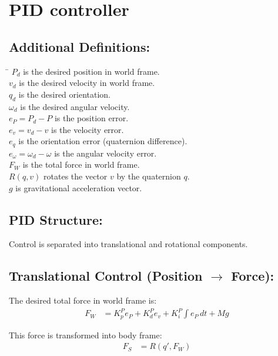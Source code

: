 \documentclass{article}
\begin{document}
\section{PID controller}

\subsection*{Additional Definitions:}
\begin{tabbing}
    \hspace{1cm}\= \kill
    \> \( P_d \) is the desired position in world frame. \\
    \> \( v_d \) is the desired velocity in world frame. \\
    \> \( q_d \) is the desired orientation. \\
    \> \( \omega_d \) is the desired angular velocity. \\
    \> \( e_P = P_d - P \) is the position error. \\
    \> \( e_v = v_d - v \) is the velocity error. \\
    \> \( e_q \) is the orientation error (quaternion difference). \\
    \> \( e_\omega = \omega_d - \omega \) is the angular velocity error. \\
    \> \( F_W \) is the total force in world frame. \\
    \> \( R(q, v) \) rotates the vector \( v \) by the quaternion \( q \). \\
    \> \( g \) is gravitational acceleration vector. \\
\end{tabbing}

\subsection*{PID Structure:}
Control is separated into translational and rotational components.

\subsection*{Translational Control (Position $\rightarrow$ Force):}

The desired total force in world frame is:
\begin{align*}
    F_W &= K_p^P e_P + K_d^P e_v + K_i^P \int e_P \, dt + M g
\end{align*}

This force is transformed into body frame:
\begin{align*}
    F_S &= R(q', F_W)
\end{align*}
\end{document}
